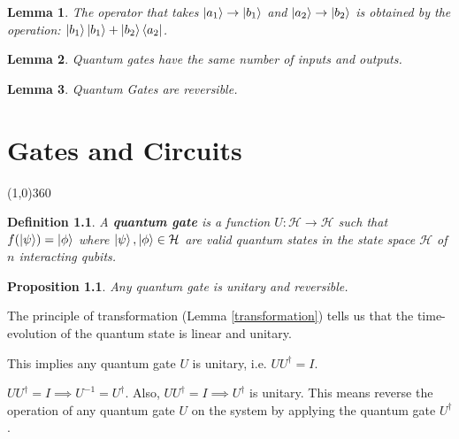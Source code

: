 \documentclass[12pt,twoside,fleqn]{report}
\makeatletter
\theoremstyle{thmstyle}
\renewenvironment{proof}[1][\proofname]{\par
\pushQED{\qed}%
\normalfont \topsep6\p@\@plus6\p@\relax
\trivlist
\item[\hskip\labelsep\itshape#1\@addpunct{.}]\mbox{}\par\nobreak\ignorespaces
}{%
    \popQED\endtrivlist\@endpefalse
    }
\newtheorem{defn}{Definition}[chapter]
\newtheorem{lemma}{Lemma}[chapter]
\newtheorem{prop}{Proposition}[chapter]
\makeatother
\begin{document}
\begin{lemma}
    The operator that takes $\ket{a_1} \to \ket{b_1}$ and $\ket{a_2} \to \ket{b_2}$ is obtained by the operation:
    $\ket{b_1}\ket{b_1} + \ket{b_2}\bra{a_2}$.
\end{lemma}

\begin{lemma}
    Quantum gates have the same number of inputs and outputs.
\end{lemma}

\begin{lemma}
    Quantum Gates are reversible.
\end{lemma}

\chapter{Gates and Circuits}
\line(1,0){360} \\

\begin{comment}
     x Definitition of quantum gates
     x Gates are unitary
     x reversible defn
     x Gates are reversible
     x quantum circuit definition
     * Quantum Gates applied to one qubit in an $n$-qubit register
     * deferred measurement principle
     * ket bra notation and how it describes a transformation
     x any reversible classical gate has a valid quantum analog
     x Quantum gates have an equal number of inputs and outputs?
     * Single Qubit Gates
     * Eigen values and Eigenvectors of Hadamard Gate
     * Multiple Qubit Gates
     * Proof that each gate described is unitary
\end{comment}


\begin{defn}
    A \textbf{quantum gate} is a function $U: \mathcal{H} \to \mathcal{H}$ such that $f(\ket\psi) = \ket\phi$ where $\ket\psi, \ket\phi \in \mathcal{H}$ are valid quantum states in the state space $\mathcal{H}$ of $n$ interacting qubits.
\end{defn}

\begin{prop}
    Any quantum gate is unitary and reversible.
\end{prop}
\begin{proof}
    The principle of transformation (Lemma \ref{transformation}) tells us that the time-evolution of the quantum state is linear and unitary. 

    This implies any quantum gate $U$ is unitary, i.e. $U U^{\dagger} = I$. 

    $U U^\dagger = I \implies U^{-1} = U^\dagger$.
    Also, $ U U^\dagger = I \implies U^\dagger$ is unitary.  
    This means reverse the operation of any quantum gate $U$ on the system by applying the quantum gate $U^\dagger$.
\end{proof}
\end{document}
